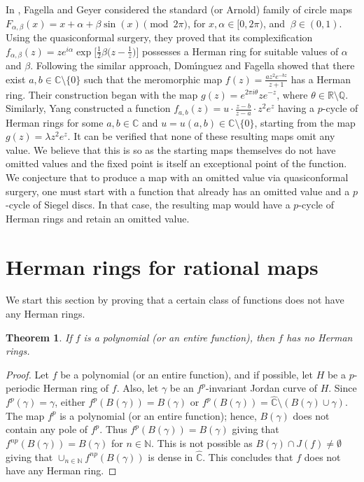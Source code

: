 \documentclass[12pt]{article}
\newtheorem{theorem}{Theorem}[section]
\begin{document}
In \cite{FG2003}, Fagella and Geyer considered the standard (or Arnold) family of circle maps $F_{\alpha,\beta}(x) = x + \alpha + \beta \sin(x) \pmod{2\pi}$, for $ x, \alpha \in [0, 2\pi)$, and $ \ \beta \in (0,1)$. Using the quasiconformal surgery, they proved that its complexification $f_{\alpha,\beta}(z) = z e^{i\alpha} \exp\Big[\frac{1}{2} \beta \Big(z - \frac{1}{z}\Big)\Big]$ possesses a Herman ring for suitable values of $\alpha$ and $\beta$. Following the similar approach, Dom{\'\i}nguez and Fagella \cite{pdnf} showed that there exist $a, b \in \mathbb{C} \setminus \{0\}$ such that the meromorphic map $f(z) = \frac{a z^2 e^{-b z}}{z + 1}$ has a Herman ring. Their construction began with the map $g(z) = e^{2\pi i \theta} z e^{-z}$, where $\theta \in \mathbb{R} \setminus \mathbb{Q}$. Similarly, Yang \cite{yang} constructed a function
$f_{a,b}(z) = u \cdot \frac{z - b}{z - a} \cdot z^2 e^z$ having a $p$-cycle of Herman rings for some $a, b \in \mathbb{C}$ and $u = u(a,b) \in \mathbb{C} \setminus \{0\}$, starting from the map $g(z) = \lambda z^2 e^z$. It can be verified that none of these resulting maps omit any value. We believe that this is so as the starting maps themselves do not have omitted values and the fixed point  is itself an exceptional point of the function. We conjecture that to produce a map with an omitted value via quasiconformal surgery, one must start with a function that already has an omitted value and a $p$-cycle of Siegel discs. In that case, the resulting map would have a $p$-cycle of Herman rings and retain an omitted value.







\section{Herman rings for rational maps}\label{rational}
We start this section by proving that a certain class of functions does not have any Herman rings.
\begin{theorem}
\label{nohr}
    If $f$ is a polynomial (or an entire function), then $f$ has no Herman rings.
\end{theorem}
\begin{proof}
    Let $f$ be a polynomial (or an entire function), and if possible, let $H$ be a $p$-periodic Herman ring of $f$. Also, let $\gamma$ be an $f^p$-invariant Jordan curve of $H$. Since $f^p(\gamma)=\gamma$, either $f^p(B(\gamma))=B(\gamma)$ or $f^p(B(\gamma))=\widehat{\mathbb{C}}\setminus (B(\gamma)\cup \gamma)$. The map  $f^p$ is a polynomial (or an entire function); hence, $B(\gamma)$ does not contain any pole of $f^p$. Thus $f^p(B(\gamma))=B(\gamma)$ giving that $f^{np}(B(\gamma))=B(\gamma)$ for $n\in \mathbb{N}$. This is not possible as $B(\gamma)\cap J(f)\neq \emptyset$ giving that $\cup_{n\in \mathbb{N}}f^{np}(B(\gamma))$ is dense in $\widehat{\mathbb{C}}$. This concludes that $f$ does not have any Herman ring. 
\end{proof}
\end{document}
